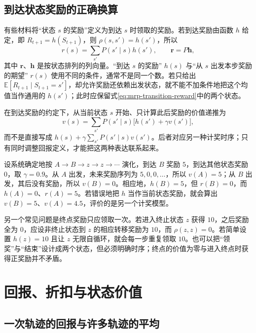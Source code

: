 \documentclass[UTF8]{ctexart}
\begin{document}
\subsection{到达状态奖励的正确换算}

有些材料将“状态 $s$ 的奖励”定义为到达 $s$ 时领取的奖励。若到达奖励由函数 $h$ 给定，即 $R_{t+1}=h(S_{t+1})$，则 $\rho(s,s')=h(s')$，所以
\begin{equation}
  r(s)=\sum_{s'}P(s'\mid s)h(s'),\qquad
  \boldsymbol r=P\boldsymbol h,
  \label{eq:mrp-arrival-reward}
\end{equation}
其中 $\boldsymbol r$、$\boldsymbol h$ 是按状态排列的列向量。“到达 $s$ 的奖励” $h(s)$ 与“从 $s$ 出发本步奖励的期望” $r(s)$ 使用不同的条件，通常不是同一个数。若只给出 $\mathbb E[R_{t+1}\mid S_{t+1}=s']$，却允许奖励还依赖出发状态，就不能不加条件地把这个均值当作通用的 $h(s')$；此时应保留式\eqref{eq:mrp-transition-reward}中的两个状态。

在到达奖励的约定下，从当前状态 $s$ 开始、只计算此后奖励的价值递推为
\begin{equation}
  v(s)=\sum_{s'}P(s'\mid s)\bigl[h(s')+\gamma v(s')\bigr],
  \label{eq:mrp-arrival-bellman}
\end{equation}
而不是直接写成 $h(s)+\gamma\sum_{s'}P(s'\mid s)v(s')$。后者对应另一种计奖时序；只有同时调整回报定义，才能把这两种表达联系起来。

\begin{example}[混用奖励约定会使结果错一拍]
\label{ex:mrp-arrival}
设系统确定地按 $A\to B\to z\to z\to\cdots$ 演化，到达 $B$ 奖励 $5$，到达其他状态奖励 $0$，取 $\gamma=0.9$。从 $A$ 出发，未来奖励序列为 $5,0,0,\ldots$，所以 $v(A)=5$；从 $B$ 出发，其后没有奖励，所以 $v(B)=0$。相应地，$h(B)=5$，但 $r(B)=0$，而 $h(A)=0$、$r(A)=5$。若错误地把 $h$ 当作当前状态奖励，就会算出 $v(B)=5$、$v(A)=4.5$，评价的是另一个计奖模型。
\end{example}

另一个常见问题是终点奖励只应领取一次。若进入终止状态 $z$ 获得 $10$，之后奖励全为 $0$，应设非终止状态到 $z$ 的相应转移奖励为 $10$，而 $\rho(z,z)=0$。若简单设置 $h(z)=10$ 且让 $z$ 无限自循环，就会每一步重复领取 $10$。也可以把“领奖”与“结束”设计成两个状态，但必须明确时序；终点的价值为零与进入终点时获得正奖励并不矛盾。

\section{回报、折扣与状态价值}
\label{sec:mrp-return}

\subsection{一次轨迹的回报与许多轨迹的平均}
\end{document}
